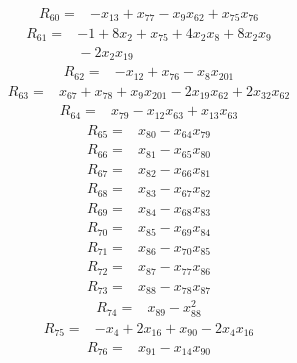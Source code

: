 \begin{align*}
R_{60} ={}& -x_{13} + x_{77} - x_{9} x_{62} + x_{75} x_{76}
\end{align*}
\begin{align*}
R_{61} ={}& -1 + 8x_{2} + x_{75} + 4x_{2} x_{8} + 8x_{2} x_{9} \\
&{} -2x_{2} x_{19}
\end{align*}
\begin{align*}
R_{62} ={}& -x_{12} + x_{76} - x_{8} x_{201}
\end{align*}
\begin{align*}
R_{63} ={}& x_{67} + x_{78} + x_{9} x_{201} - 2x_{19} x_{62} + 2x_{32} x_{62}
\end{align*}
\begin{align*}
R_{64} ={}& x_{79} - x_{12} x_{63} + x_{13} x_{63}
\end{align*}
\begin{align*}
R_{65} ={}& x_{80} - x_{64} x_{79}
\end{align*}
\begin{align*}
R_{66} ={}& x_{81} - x_{65} x_{80}
\end{align*}
\begin{align*}
R_{67} ={}& x_{82} - x_{66} x_{81}
\end{align*}
\begin{align*}
R_{68} ={}& x_{83} - x_{67} x_{82}
\end{align*}
\begin{align*}
R_{69} ={}& x_{84} - x_{68} x_{83}
\end{align*}
\begin{align*}
R_{70} ={}& x_{85} - x_{69} x_{84}
\end{align*}
\begin{align*}
R_{71} ={}& x_{86} - x_{70} x_{85}
\end{align*}
\begin{align*}
R_{72} ={}& x_{87} - x_{77} x_{86}
\end{align*}
\begin{align*}
R_{73} ={}& x_{88} - x_{78} x_{87}
\end{align*}
\begin{align*}
R_{74} ={}& x_{89} - x_{88}^{2}
\end{align*}
\begin{align*}
R_{75} ={}& -x_{4} + 2x_{16} + x_{90} - 2x_{4} x_{16}
\end{align*}
\begin{align*}
R_{76} ={}& x_{91} - x_{14} x_{90}
\end{align*}
